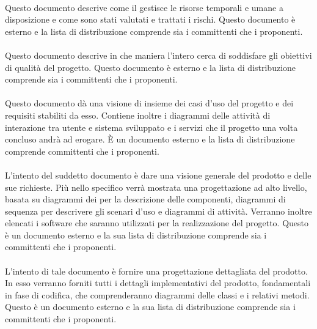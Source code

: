 \paragraph{\PdP}
Questo documento descrive come il  gestisce le risorse
temporali e umane a disposizione e come sono stati valutati e trattati i rischi. Questo documento è esterno e la lista di distribuzione comprende sia i committenti che i proponenti.

\paragraph{\PdQ}
Questo documento descrive in che maniera l'intero  cerca di soddisfare gli obiettivi di qualità del progetto. Questo documento è esterno e la lista di distribuzione comprende sia i committenti che i proponenti.

\paragraph{\AdR}
Questo documento dà una visione di insieme dei casi d'uso del progetto e dei requisiti stabiliti da esso. Contiene inoltre i diagrammi delle attività di interazione tra utente e sistema sviluppato e i servizi che il progetto una volta concluso andrà ad erogare. È un documento esterno e la lista di distribuzione comprende committenti che i proponenti.

\paragraph{\ST}
L'intento del suddetto documento è dare una visione generale del prodotto e delle sue richieste. Più nello specifico verrà mostrata una progettazione ad alto livello, basata su diagrammi dei  per la descrizione delle componenti, diagrammi di sequenza per descrivere gli scenari d'uso e diagrammi di attività. Verranno inoltre elencati i software che saranno utilizzati per la realizzazione del progetto. Questo è un documento esterno e la sua lista di distribuzione comprende  sia i committenti che i proponenti.

\paragraph{\DDP}
L'intento di tale documento è fornire una progettazione dettagliata del
prodotto. In esso verranno forniti tutti i dettagli implementativi del prodotto, fondamentali in fase di codifica, che comprenderanno diagrammi  delle classi e i relativi metodi. Questo è un documento esterno e la sua lista di distribuzione comprende  sia i committenti che i proponenti.

